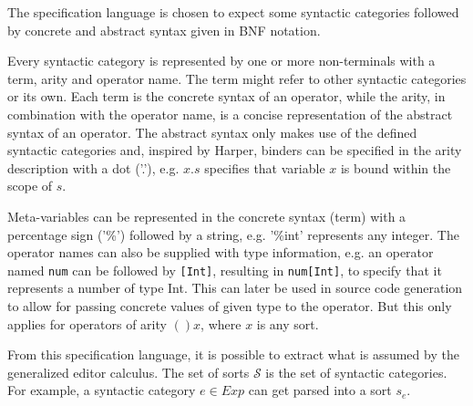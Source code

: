 \documentclass[sigplan,review]{acmart}
\begin{document}
The specification language is chosen to expect some syntactic
categories followed by concrete and abstract syntax given in BNF notation.


Every syntactic category is represented by one or more non-terminals
with a term, arity and operator name. The term might refer to other
syntactic categories or its own. Each term is the concrete syntax of
an operator, while the arity, in combination with the operator name,
is a concise representation of the abstract syntax of an operator.
The abstract syntax only makes use of the defined syntactic categories and, inspired by Harper\cite{harper_foundations}, binders can be specified in the arity description with a dot ('.'), e.g. $x.s$ specifies that variable $x$ is bound within the scope of $s$.

Meta-variables can be represented in the concrete syntax (term) with a percentage sign ('\%') followed by a string, e.g. '\%int' represents any integer. The operator
names can also be supplied with type information, e.g. an operator named
\texttt{num} can be followed by \texttt{[Int]}, resulting in \texttt{num[Int]}, to specify that it represents a number of type Int. This can later be used in source code generation to allow for passing concrete values of given type to the operator. But this only applies for operators of arity $()x$, where $x$ is any sort.

From this specification language, it is possible to extract what is assumed by the generalized editor calculus. The set of sorts $\mathcal{S}$ is the set of syntactic categories. For example, a syntactic category $e \in Exp$ can get parsed into a sort $s_{e}$.
\end{document}
